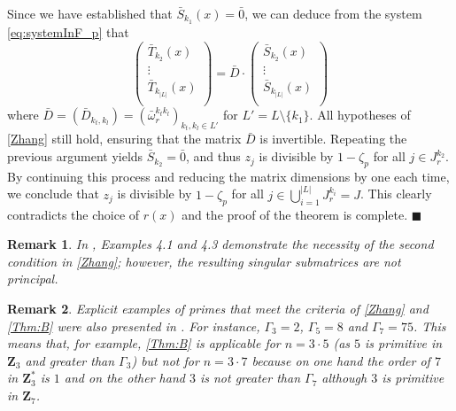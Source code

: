 \documentclass[a4paper,12pt,reqno]{amsart}
\newtheorem{remark}{Remark}
\newenvironment{proofofB}{{\bf {Proof of Theorem \ref{Thm:B}.} }}{\hfill $\blacksquare$ \\}
\def\Z{\mathbf{Z}}
\begin{document}
\begin{proofofB}
Since we have established that $\bar{S}_{k_1}(x)=\bar{0}$, we can deduce from the system \eqref{eq:systemInF_p} that
\begin{equation}
   \left( \begin{matrix}
    \bar{T}_{k_2}(x)\\
    \vdots\\
    \bar{T}_{k_{|L|}}(x)\\
\end{matrix}
\right)
= \bar{D} \cdot  \left( \begin{matrix}
    \bar{S}_{k_2}(x)\\
    \vdots\\
    \bar{S}_{k_{|L|}}(x)\\
\end{matrix}
\right) 
\end{equation}
where $\bar{D}= (\bar{D}_{k_t,k_l})=(\bar{\omega}_r^{k_tk_l})_{k_t, k_l \in L'}$  for $L'= L \setminus \{ k_1 \}$. All hypotheses of \autoref{Zhang} still hold, ensuring that the matrix $\bar{D}$ is invertible. Repeating the previous argument yields $\bar{S}_{k_2} = \bar{0}$, and thus   $z_j$ is divisible by $1 - \zeta_p$ for all $j \in J_r^{k_2}$. By continuing this process and reducing the matrix dimensions by one each time, we conclude that $z_j$ is divisible by $1 - \zeta_p$ for all $j \in \bigcup_{i=1}^{|L|} J_r^{k_i} = J$. This clearly contradicts the choice of $r(x)$ and the proof of the 
theorem is complete.
\end{proofofB}

\begin{remark}
    In \cite{Zhang}, Examples 4.1 and 4.3 demonstrate the necessity of the second condition in \autoref{Zhang}; however, the resulting singular submatrices are not principal.
\end{remark}

\begin{remark}
    Explicit examples of primes that meet the criteria of \autoref{Zhang} and \autoref{Thm:B} were also presented in \cite{Zhang}. For instance, 
    $\Gamma_3= 2$, $\Gamma_5=8$  and $\Gamma_7=75$. This means that, for example,  \autoref{Thm:B} is applicable for $n=3\cdot 5$  (as $5$ is primitive in $\Z_3$ and greater than $\Gamma_3$) but not for $n= 3 \cdot 7$ because on one hand the order of $7$ in $\Z_3^*$ is $1$  and  on the other hand  $3$ is not greater than $\Gamma_7$ 
    although  $3$ is primitive in $\Z_7$.
\end{remark}
\end{document}
